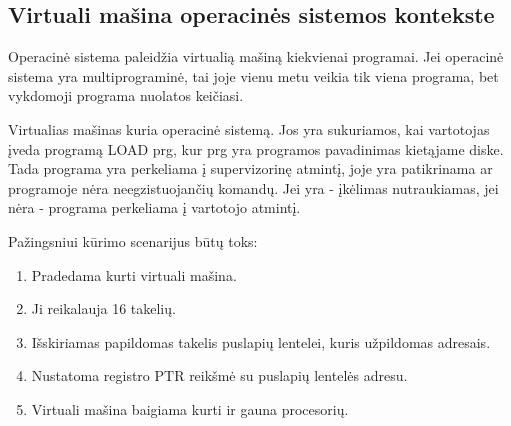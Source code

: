 \documentclass{VUMIFInfKursinis}
\begin{document}
\subsection{Virtuali mašina operacinės sistemos kontekste}

Operacinė sistema paleidžia virtualią mašiną kiekvienai programai. Jei operacinė sistema yra multiprograminė, tai joje vienu metu veikia tik viena programa, bet vykdomoji programa nuolatos keičiasi.

Virtualias mašinas kuria operacinė sistemą. Jos yra sukuriamos, kai vartotojas įveda programą LOAD prg, kur prg yra programos pavadinimas kietąjame diske. Tada programa yra perkeliama į supervizorinę atmintį, joje yra patikrinama ar programoje nėra neegzistuojančių komandų. Jei yra - įkėlimas nutraukiamas, jei nėra - programa perkeliama į vartotojo atmintį.

Pažingsniui kūrimo scenarijus būtų toks:

\begin{enumerate}
	\item Pradedama kurti virtuali mašina.
	\item Ji reikalauja 16 takelių.
	\item Išskiriamas papildomas takelis puslapių lentelei, kuris užpildomas adresais.
	\item Nustatoma registro PTR reikšmė su puslapių lentelės adresu.
	\item Virtuali mašina baigiama kurti ir gauna procesorių.
\end{enumerate}

\printbibliography[heading=bibintoc] %
\appendix  %
\end{document}
